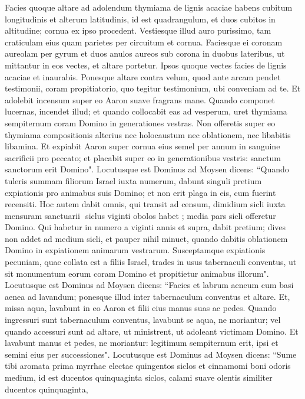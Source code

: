 \begin{biblechapter}  
\verse Facies quoque altare ad adolendum thymiama de lignis acaciae 
\verse habens cubitum longitudinis et alterum latitudinis, id est quadrangulum, et duos cubitos in altitudine; cornua ex ipso procedent. 
\verse Vestiesque illud auro purissimo, tam craticulam eius quam parietes per circuitum et cornua. Faciesque ei coronam aureolam per gyrum 
\verse et duos anulos aureos sub corona in duobus lateribus, ut mittantur in eos vectes, et altare portetur. 
\verse Ipsos quoque vectes facies de lignis acaciae et inaurabis. 
\verse Ponesque altare contra velum, quod ante arcam pendet testimonii, coram propitiatorio, quo tegitur testimonium, ubi conveniam ad te. 
\verse Et adolebit incensum super eo Aaron suave fragrans mane. Quando componet lucernas, incendet illud; 
\verse et quando collocabit eas ad vesperum, uret thymiama sempiternum coram Domino in generationes vestras. 
\verse Non offeretis super eo thymiama compositionis alterius nec holocaustum nec oblationem, nec libabitis libamina. 
\verse Et expiabit Aaron super cornua eius semel per annum in sanguine sacrificii pro peccato; et placabit super eo in generationibus vestris: sanctum sanctorum erit Domino". 
\verse Locutusque est Dominus ad Moysen dicens: 
\verse “Quando tuleris summam filiorum Israel iuxta numerum, dabunt singuli pretium expiationis pro animabus suis Domino; et non erit plaga in eis, cum fuerint recensiti. 
\verse Hoc autem dabit omnis, qui transit ad censum, dimidium sicli iuxta mensuram sanctuarii ­ siclus viginti obolos habet ­; media pars sicli offeretur Domino. 
\verse Qui habetur in numero a viginti annis et supra, dabit pretium; 
\verse dives non addet ad medium sicli, et pauper nihil minuet, quando dabitis oblationem Domino in expiationem animarum vestrarum. 
\verse Susceptamque expiationis pecuniam, quae collata est a filiis Israel, trades in usus tabernaculi conventus, ut sit monumentum eorum coram Domino et propitietur animabus illorum". 
\verse Locutusque est Dominus ad Moysen dicens: 
\verse “Facies et labrum aeneum cum basi aenea ad lavandum; ponesque illud inter tabernaculum conventus et altare. Et, missa aqua, 
\verse lavabunt in eo Aaron et filii eius manus suas ac pedes.  
\verse Quando ingressuri sunt tabernaculum conventus, lavabunt se aqua, ne moriantur; vel quando accessuri sunt ad altare, ut ministrent, ut adoleant victimam Domino. 
\verse Et lavabunt manus et pedes, ne moriantur: legitimum sempiternum erit, ipsi et semini eius per successiones". 
\verse Locutusque est Dominus ad Moysen 
\verse dicens: “Sume tibi aromata prima myrrhae electae quingentos siclos et cinnamomi boni odoris medium, id est ducentos quinquaginta siclos, calami suave olentis similiter ducentos quinquaginta, 

\end{biblechapter}
